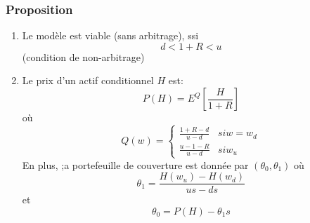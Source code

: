 \documentclass{article}
\begin{document}
\subsubsection{Proposition} 
\begin{enumerate}
\item Le mod\`ele est viable (sans arbitrage), ssi
\begin{equation}
d<1+R<u
\end{equation}
(condition de non-arbitrage)

\item Le prix d'un actif conditionnel $H$ est:
\begin{equation}
P(H)=E^Q[\frac{H}{1+R}]
\end{equation} 
o\`u
\begin{equation}
Q(w) = \left\{\begin{array}{rcl}
	\frac{1+R-d}{u-d} & si w=w_d\\
\frac{u-1-R}{u-d} & si w_u
\end{array} \right.
\end{equation}
En plus, ;a portefeuille de couverture est donn\'ee par $(\theta_0,\theta_1)$ o\`u 
\begin{equation}
\theta_1=\frac{H(w_u)-H(w_d)}{us-ds}
\end{equation}
et
\begin{equation}
\theta_0=P(H)-\theta_1 s
\end{equation}
\end{enumerate}
\end{document}
